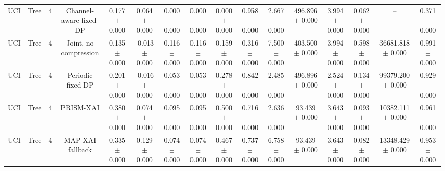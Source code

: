\begin{tabular}{lccccccccccccccc}
UCI & Tree & 4 & Channel-aware fixed-DP & 0.177 $\pm$ 0.000 & 0.064 $\pm$ 0.000 & 0.000 $\pm$ 0.000 & 0.000 $\pm$ 0.000 & 0.000 $\pm$ 0.000 & 0.958 $\pm$ 0.000 & 2.667 $\pm$ 0.000 & 496.896 $\pm$ 0.000 & 3.994 $\pm$ 0.000 & 0.062 $\pm$ 0.000 & -- & 0.371 $\pm$ 0.000 \\
UCI & Tree & 4 & Joint, no compression & 0.135 $\pm$ 0.000 & -0.013 $\pm$ 0.000 & 0.116 $\pm$ 0.000 & 0.116 $\pm$ 0.000 & 0.159 $\pm$ 0.000 & 0.316 $\pm$ 0.000 & 7.500 $\pm$ 0.000 & 403.500 $\pm$ 0.000 & 3.994 $\pm$ 0.000 & 0.598 $\pm$ 0.000 & 36681.818 $\pm$ 0.000 & 0.991 $\pm$ 0.000 \\
UCI & Tree & 4 & Periodic fixed-DP & 0.201 $\pm$ 0.000 & -0.016 $\pm$ 0.000 & 0.053 $\pm$ 0.000 & 0.053 $\pm$ 0.000 & 0.278 $\pm$ 0.000 & 0.842 $\pm$ 0.000 & 2.485 $\pm$ 0.000 & 496.896 $\pm$ 0.000 & 2.524 $\pm$ 0.000 & 0.134 $\pm$ 0.000 & 99379.200 $\pm$ 0.000 & 0.929 $\pm$ 0.000 \\
UCI & Tree & 4 & PRISM-XAI & 0.380 $\pm$ 0.000 & 0.074 $\pm$ 0.000 & 0.095 $\pm$ 0.000 & 0.095 $\pm$ 0.000 & 0.500 $\pm$ 0.000 & 0.716 $\pm$ 0.000 & 2.636 $\pm$ 0.000 & 93.439 $\pm$ 0.000 & 3.643 $\pm$ 0.000 & 0.093 $\pm$ 0.000 & 10382.111 $\pm$ 0.000 & 0.961 $\pm$ 0.000 \\
UCI & Tree & 4 & MAP-XAI fallback & 0.335 $\pm$ 0.000 & 0.129 $\pm$ 0.000 & 0.074 $\pm$ 0.000 & 0.074 $\pm$ 0.000 & 0.467 $\pm$ 0.000 & 0.737 $\pm$ 0.000 & 6.758 $\pm$ 0.000 & 93.439 $\pm$ 0.000 & 3.643 $\pm$ 0.000 & 0.082 $\pm$ 0.000 & 13348.429 $\pm$ 0.000 & 0.953 $\pm$ 0.000 \\
\bottomrule
\end{tabular}
